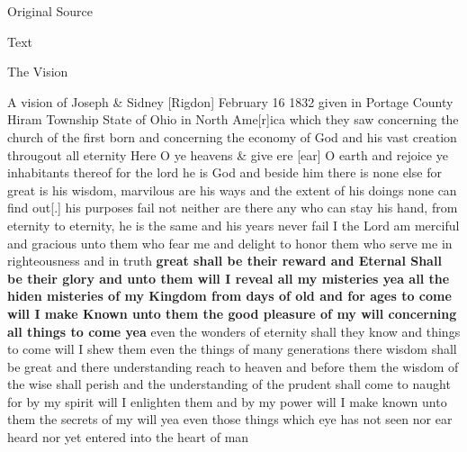 			
			\begin{description}
				\item[Original Source]
			\end{description}
			
			
			\begin{description}
				\item[Text]
			\end{description}
			
				\begin{tightcenter}
				The Vision
				\end{tightcenter}
			
				A vision of Joseph \& Sidney [Rigdon] February 16 1832 given in Portage County Hiram Township State of Ohio in North Ame[r]ica which they saw concerning the church of the first born and concerning the economy of God and his vast creation througout all eternity Here O ye heavens \& give ere [ear] O earth and rejoice ye inhabitants thereof for the lord he is God and beside him there is none else for great is his wisdom, marvilous are his ways and the extent of his doings none can find out[.] his purposes fail not neither are there any who can stay his hand, from eternity to eternity, he is the same and his years never fail I the Lord am merciful and gracious unto them who fear me and delight to honor them who serve me in righteousness and in truth \textbf{great shall be their reward and Eternal Shall be their glory and unto them will I reveal all my misteries yea all the hiden misteries of my Kingdom from days of old and for ages to come will I make Known unto them the good pleasure of my will concerning all things to come yea} even the wonders of eternity shall they know and things to come will I shew them even the things of many generations there wisdom shall be great and there understanding reach to heaven and before them the wisdom of the wise shall perish and the understanding of the prudent shall come to naught for by my spirit will I enlighten them and by my power will I make known unto them the secrets of my will yea even those things which eye has not seen nor ear heard nor yet entered into the heart of man

